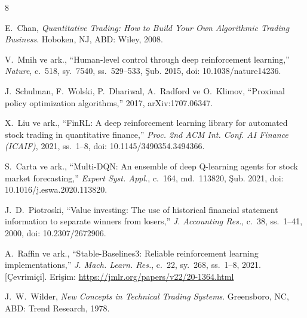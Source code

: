 \documentclass[journal]{IEEEtran}
\begin{document}
\begin{thebibliography}{8}

E.~Chan,
\textit{Quantitative Trading: How to Build Your Own Algorithmic Trading Business}.
Hoboken, NJ, ABD: Wiley, 2008.

V.~Mnih ve ark.,
``Human-level control through deep reinforcement learning,''
\textit{Nature}, c.~518, sy.~7540, ss.~529--533, Şub. 2015,
doi: 10.1038/nature14236.

J.~Schulman, F.~Wolski, P.~Dhariwal, A.~Radford ve O.~Klimov,
``Proximal policy optimization algorithms,''
2017, arXiv:1707.06347.

X.~Liu ve ark.,
``FinRL: A deep reinforcement learning library for automated stock
trading in quantitative finance,''
\textit{Proc. 2nd ACM Int. Conf. AI Finance (ICAIF)}, 2021,
ss.~1--8, doi: 10.1145/3490354.3494366.

S.~Carta ve ark.,
``Multi-DQN: An ensemble of deep Q-learning agents for stock market
forecasting,''
\textit{Expert Syst. Appl.}, c.~164, md.~113820, Şub. 2021,
doi: 10.1016/j.eswa.2020.113820.

J.~D.~Piotroski,
``Value investing: The use of historical financial statement information
to separate winners from losers,''
\textit{J. Accounting Res.}, c.~38, ss.~1--41, 2000,
doi: 10.2307/2672906.

A.~Raffin ve ark.,
``Stable-Baselines3: Reliable reinforcement learning implementations,''
\textit{J. Mach. Learn. Res.}, c.~22, sy.~268, ss.~1--8, 2021.
[Çevrimiçi]. Erişim: \url{https://jmlr.org/papers/v22/20-1364.html}

J.~W.~Wilder,
\textit{New Concepts in Technical Trading Systems}.
Greensboro, NC, ABD: Trend Research, 1978.

\end{thebibliography}
\end{document}
